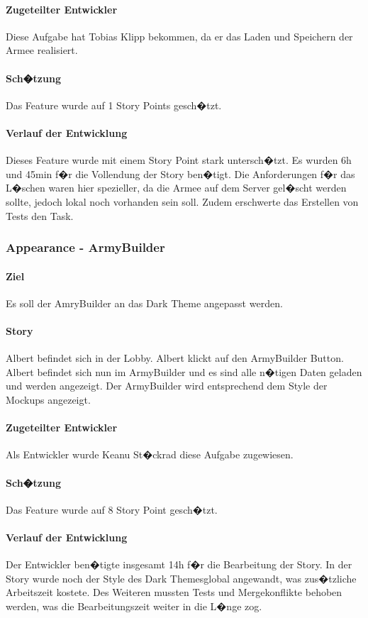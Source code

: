 \documentclass[12pt, titlepage]{scrartcl}
\begin{document}
			\paragraph{Zugeteilter Entwickler} Diese Aufgabe hat Tobias Klipp bekommen, da er das Laden und Speichern der Armee realisiert.
			\paragraph{Sch�tzung}
			Das Feature wurde auf 1 Story Points gesch�tzt.
			\paragraph{Verlauf der Entwicklung} 
			Dieses Feature wurde mit einem Story Point stark untersch�tzt. Es wurden 6h und 45min f�r die Vollendung der Story ben�tigt. Die Anforderungen f�r das L�schen waren hier spezieller, da die Armee auf dem Server gel�scht werden sollte, jedoch lokal noch vorhanden sein soll. Zudem erschwerte das Erstellen von Tests den Task.
			
			\subsubsection{Appearance - ArmyBuilder}
			\paragraph{Ziel} Es soll der AmryBuilder an das Dark Theme angepasst werden.
			\paragraph{Story} Albert befindet sich in der Lobby. Albert klickt auf den ArmyBuilder Button. Albert befindet sich nun im ArmyBuilder und es sind alle n�tigen Daten geladen und werden angezeigt. Der ArmyBuilder wird entsprechend dem Style der Mockups angezeigt.
			\paragraph{Zugeteilter Entwickler} Als Entwickler wurde Keanu St�ckrad diese Aufgabe zugewiesen.
			\paragraph{Sch�tzung}
			Das Feature wurde auf 8 Story Point gesch�tzt.
			\paragraph{Verlauf der Entwicklung} 
			Der Entwickler ben�tigte insgesamt 14h f�r die Bearbeitung der Story. In der Story wurde noch der Style des \glqq Dark Themes\grqq global angewandt, was zus�tzliche Arbeitszeit kostete. Des Weiteren mussten Tests und Mergekonflikte behoben werden, was die Bearbeitungszeit weiter in die L�nge zog.
			 
\end{document}
